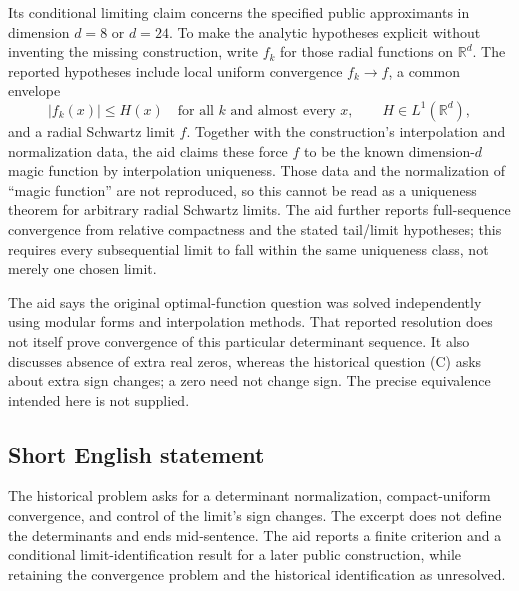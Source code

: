 \documentclass[11pt]{article}
\newcommand{\R}{\mathbb{R}}
\begin{document}
Its conditional limiting claim concerns the specified public approximants in dimension \(d=8\) or \(d=24\). To make the analytic hypotheses explicit without inventing the missing construction, write \(f_k\) for those radial functions on \(\R^d\). The reported hypotheses include local uniform convergence \(f_k\to f\), a common envelope
\[
 |f_k(x)|\le H(x)\quad\text{for all }k\text{ and almost every }x,
 \qquad H\in L^1(\R^d),
\]
and a radial Schwartz limit \(f\). Together with the construction's interpolation and normalization data, the aid claims these force \(f\) to be the known dimension-\(d\) magic function by interpolation uniqueness. Those data and the normalization of ``magic function'' are not reproduced, so this cannot be read as a uniqueness theorem for arbitrary radial Schwartz limits. The aid further reports full-sequence convergence from relative compactness and the stated tail/limit hypotheses; this requires every subsequential limit to fall within the same uniqueness class, not merely one chosen limit.

The aid says the original optimal-function question was solved independently using modular forms and interpolation methods. That reported resolution does not itself prove convergence of this particular determinant sequence. It also discusses absence of extra real zeros, whereas the historical question (C) asks about extra sign changes; a zero need not change sign. The precise equivalence intended here is not supplied.
\subsection{Short English statement}
The historical problem asks for a determinant normalization, compact-uniform convergence, and control of the limit's sign changes. The excerpt does not define the determinants and ends mid-sentence. The aid reports a finite criterion and a conditional limit-identification result for a later public construction, while retaining the convergence problem and the historical identification as unresolved.
\end{document}

